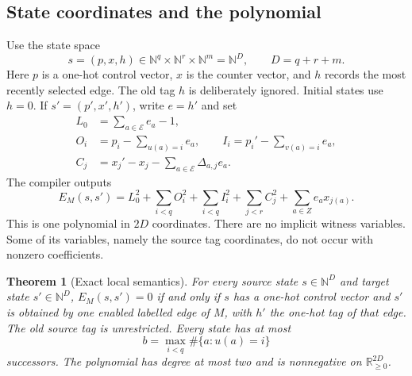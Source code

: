 \documentclass[11pt,letterpaper]{article}
\newtheorem{theorem}{Theorem}[section]
\theoremstyle{definition}
\theoremstyle{remark}
\newcommand{\N}{\mathbb N}
\newcommand{\R}{\mathbb R}
\newcommand{\1}{\mathbf 1}
\begin{document}
\subsection{State coordinates and the polynomial}

Use the state space
\begin{equation}\label{lbh:qd:eq:state}
 s=(p,x,h)\in\N^q\times\N^r\times\N^m=\N^D,
 \qquad D=q+r+m.
\end{equation}
Here $p$ is a one-hot control vector, $x$ is the counter vector, and $h$
records the most recently selected edge. The old tag $h$ is deliberately
ignored. Initial states use $h=0$. If $s'=(p',x',h')$, write $e=h'$ and set
\begin{align}
 L_0&=\sum_{a\in\mathcal E}e_a-1,\nonumber\\
 O_i&=p_i-\sum_{u(a)=i}e_a,\qquad
 I_i=p_i'-\sum_{v(a)=i}e_a,\label{lbh:qd:eq:residuals}\\
 C_j&=x_j'-x_j-\sum_{a\in\mathcal E}\Delta_{a,j}e_a.\nonumber
\end{align}
The compiler outputs
\begin{equation}\boxed{\displaystyle
 E_M(s,s')=L_0^2+\sum_{i<q}O_i^2+\sum_{i<q}I_i^2
                +\sum_{j<r}C_j^2+\sum_{a\in Z}e_a x_{j(a)}.}
 \label{lbh:qd:eq:energy}
\end{equation}
This is one polynomial in $2D$ coordinates. There are no implicit witness
variables. Some of its variables, namely the source tag coordinates, do not
occur with nonzero coefficients.

\begin{theorem}[Exact local semantics]\label{lbh:qd:thm:compiler}
For every source state $s\in\N^D$ and target state $s'\in\N^D$,
$E_M(s,s')=0$ if and only if $s$ has a one-hot control vector and $s'$ is
obtained by one enabled labelled edge of $M$, with $h'$ the one-hot tag of
that edge. The old source tag is unrestricted. Every state has at most
\[
 b=\max_{i<q}\#\{a:u(a)=i\}
\]
successors. The polynomial has degree at most two and is nonnegative on
$\R_{\geq0}^{2D}$.
\end{theorem}
\end{document}
